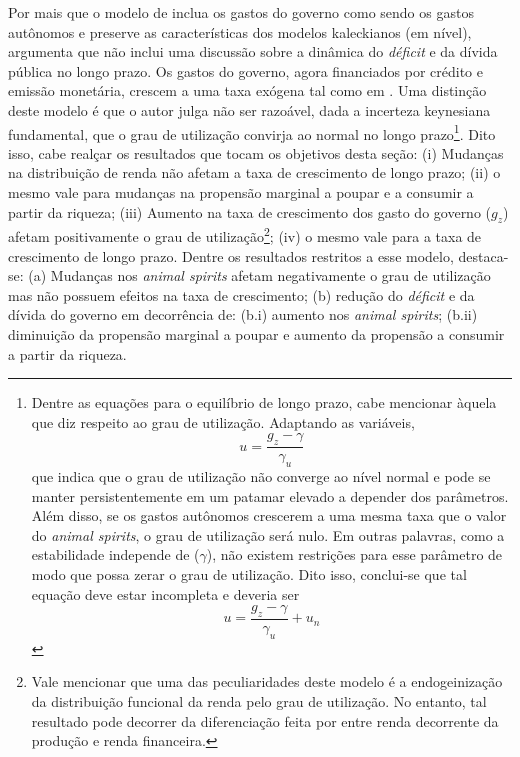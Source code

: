 Por mais que o modelo de \textcite{allain_macroeconomic_2014} inclua os gastos do governo como sendo os gastos autônomos e preserve as características dos modelos kaleckianos (em nível), \textcite{hein_autonomous_2018} argumenta que não inclui uma discussão sobre a dinâmica do \textit{déficit} e da dívida pública no longo prazo. Os gastos do governo, agora financiados por crédito e emissão monetária, crescem a uma taxa exógena tal como em \textcite{allain_macroeconomic_2014}. Uma distinção deste modelo é que o autor julga não ser razoável, dada a incerteza keynesiana fundamental, que o grau de utilização convirja ao normal no longo prazo\footnote{
	Dentre as equações para o equilíbrio de longo prazo, cabe mencionar àquela que diz respeito ao grau de utilização. Adaptando as variáveis,
	$$
	u = \frac{g_z - \gamma}{\gamma_u}
	$$
	que indica que o grau de utilização não converge ao nível normal e pode se manter persistentemente em um patamar elevado a depender dos parâmetros. Além disso, se os gastos autônomos crescerem a uma mesma taxa que o valor do \textit{animal spirits}, o grau de utilização será nulo. Em outras palavras, como a estabilidade independe de ($\gamma$), não existem restrições para esse parâmetro de modo que possa zerar o grau de utilização. Dito isso, conclui-se que tal equação deve estar incompleta e deveria ser
	$$
	u = \frac{g_z - \gamma}{\gamma_u} + u_n
	$$
}. 
Dito isso, cabe realçar os resultados que tocam os objetivos desta seção: 
	(i) Mudanças na distribuição de renda não afetam a taxa de crescimento de longo prazo; 
	(ii) o mesmo vale para mudanças na propensão marginal a poupar e a consumir a partir da riqueza; 
	(iii) Aumento na taxa de crescimento dos gasto do governo ($g_z$) afetam positivamente o grau de utilização\footnote{
		Vale mencionar que uma das peculiaridades deste modelo é a endogeinização da distribuição funcional da renda pelo grau de utilização. No entanto, tal resultado pode decorrer da diferenciação feita por \textcite{hein_autonomous_2018} entre renda decorrente da produção e renda financeira.
		}; 
	(iv) o mesmo vale para a taxa de crescimento de longo prazo. 
Dentre os resultados restritos a esse modelo, destaca-se:  
	(a) Mudanças nos \textit{animal spirits} afetam negativamente o grau de utilização mas não possuem efeitos na taxa de crescimento; 
	(b) redução do \textit{déficit} e da dívida do governo em decorrência de: 
		(b.i) aumento nos \textit{animal spirits}; 
		(b.ii) diminuição da propensão marginal a poupar e aumento da propensão a consumir a partir da riqueza. 

